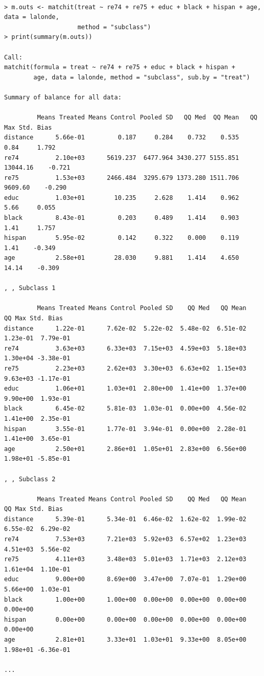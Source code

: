 \documentclass[oneside,letterpaper,titlepage]{article}
\begin{document}
\begin{verbatim}

> m.outs <- matchit(treat ~ re74 + re75 + educ + black + hispan + age, data = lalonde, 
                    method = "subclass")
> print(summary(m.outs))

Call:
matchit(formula = treat ~ re74 + re75 + educ + black + hispan +     
        age, data = lalonde, method = "subclass", sub.by = "treat")

Summary of balance for all data:

         Means Treated Means Control Pooled SD   QQ Med  QQ Mean   QQ Max Std. Bias
distance      5.66e-01         0.187     0.284    0.732    0.535     0.84     1.792
re74          2.10e+03      5619.237  6477.964 3430.277 5155.851 13044.16    -0.721
re75          1.53e+03      2466.484  3295.679 1373.280 1511.706  9609.60    -0.290
educ          1.03e+01        10.235     2.628    1.414    0.962     5.66     0.055
black         8.43e-01         0.203     0.489    1.414    0.903     1.41     1.757
hispan        5.95e-02         0.142     0.322    0.000    0.119     1.41    -0.349
age           2.58e+01        28.030     9.881    1.414    4.650    14.14    -0.309
        
, , Subclass 1

         Means Treated Means Control Pooled SD    QQ Med   QQ Mean    QQ Max Std. Bias
distance      1.22e-01      7.62e-02  5.22e-02  5.48e-02  6.51e-02  1.23e-01  7.79e-01
re74          3.63e+03      6.33e+03  7.15e+03  4.59e+03  5.18e+03  1.30e+04 -3.38e-01
re75          2.23e+03      2.62e+03  3.30e+03  6.63e+02  1.15e+03  9.63e+03 -1.17e-01
educ          1.06e+01      1.03e+01  2.80e+00  1.41e+00  1.37e+00  9.90e+00  1.93e-01
black         6.45e-02      5.81e-03  1.03e-01  0.00e+00  4.56e-02  1.41e+00  2.35e-01
hispan        3.55e-01      1.77e-01  3.94e-01  0.00e+00  2.28e-01  1.41e+00  3.65e-01
age           2.50e+01      2.86e+01  1.05e+01  2.83e+00  6.56e+00  1.98e+01 -5.85e-01
        
, , Subclass 2

         Means Treated Means Control Pooled SD    QQ Med   QQ Mean    QQ Max Std. Bias
distance      5.39e-01      5.34e-01  6.46e-02  1.62e-02  1.99e-02  6.55e-02  6.29e-02
re74          7.53e+03      7.21e+03  5.92e+03  6.57e+02  1.23e+03  4.51e+03  5.56e-02
re75          4.11e+03      3.48e+03  5.01e+03  1.71e+03  2.12e+03  1.61e+04  1.10e-01
educ          9.00e+00      8.69e+00  3.47e+00  7.07e-01  1.29e+00  5.66e+00  1.03e-01
black         1.00e+00      1.00e+00  0.00e+00  0.00e+00  0.00e+00  0.00e+00          
hispan        0.00e+00      0.00e+00  0.00e+00  0.00e+00  0.00e+00  0.00e+00          
age           2.81e+01      3.33e+01  1.03e+01  9.33e+00  8.05e+00  1.98e+01 -6.36e-01
        
...
\end{verbatim}
\end{document}
